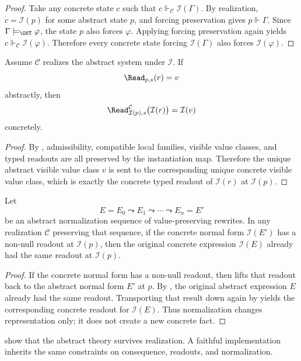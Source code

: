 \begin{proof}
Take any concrete state $c$ such that $c\Vdash_{\mathcal C}\mathcal I(\Gamma)$. By realization, $c=\mathcal I(p)$ for some abstract state $p$, and forcing preservation gives $p\Vdash\Gamma$. Since $\Gamma\models_{\OST}\varphi$, the state $p$ also forces $\varphi$. Applying forcing preservation again yields $c\Vdash_{\mathcal C}\mathcal I(\varphi)$. Therefore every concrete state forcing $\mathcal I(\Gamma)$ also forces $\mathcal I(\varphi)$.
\end{proof}

\begin{proposition}\label{prop:readout-transport}
Assume $\mathcal C$ realizes the abstract system under $\mathcal I$. If
\[
\Read_{p,s}(r)=v
\]
abstractly, then
\[
\Read^{\mathcal C}_{\mathcal I(p),s}\bigl(\mathcal I(r)\bigr)=\mathcal I(v)
\]
concretely.
\end{proposition}

\begin{proof}
By , admissibility, compatible local families, visible value classes, and typed readouts are all preserved by the instantiation map. Therefore the unique abstract visible value class $v$ is sent to the corresponding unique concrete visible value class, which is exactly the concrete typed readout of $\mathcal I(r)$ at $\mathcal I(p)$.
\end{proof}

\begin{corollary}\label{cor:concrete-normalization-no-fact-creation}
Let
\[
E=E_0\leadsto E_1\leadsto\cdots\leadsto E_n=E'
\]
be an abstract normalization sequence of value-preserving rewrites. In any realization $\mathcal C$ preserving that sequence, if the concrete normal form $\mathcal I(E')$ has a non-null readout at $\mathcal I(p)$, then the original concrete expression $\mathcal I(E)$ already had the same readout at $\mathcal I(p)$.
\end{corollary}

\begin{proof}
If the concrete normal form has a non-null readout, then  lifts that readout back to the abstract normal form $E'$ at $p$. By , the original abstract expression $E$ already had the same readout. Transporting that result down again by  yields the corresponding concrete readout for $\mathcal I(E)$. Thus normalization changes representation only; it does not create a new concrete fact.
\end{proof}

 show that the abstract theory survives realization. A faithful implementation inherits the same constraints on consequence, readouts, and normalization.
